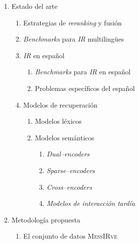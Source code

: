 \documentclass[12pt]{article}
\begin{document}
\begin{enumerate}
\begin{enumerate}
            \item Entrenamiento y adaptación de modelos
            
            \item Resumen
        \end{enumerate}
        
		\item Estado del arte
        \begin{enumerate}
            \item Estrategias de \textit{reranking} y fusión
            
            \item  \textit{Benchmarks} para \textit{IR} multilingües
            
            \item \textit{IR} en español
            \begin{enumerate}
                \item \textit{Benchmarks} para \textit{IR} en español
                
                \item Problemas específicos del español
            \end{enumerate}

            \item Modelos de recuperación
            \begin{enumerate}
                \item Modelos léxicos
                
                \item Modelos semánticos
                \begin{enumerate}
                    \item \textit{Dual--encoders}
                    
                    \item \textit{Sparse--encoders}
                    
                    \item \textit{Cross--encoders}
                    
                    \item \textit{Modelos de interacción tardía}
                \end{enumerate}
            \end{enumerate}
        \end{enumerate}
        
        \item Metodología propuesta
        \begin{enumerate}
            \item El conjunto de datos \textsc{MessIRve}
            

\end{enumerate}
\end{enumerate}
\end{document}
